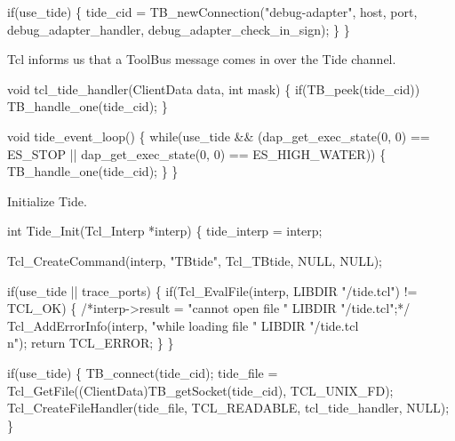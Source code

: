   if(use_tide) \{
    tide_cid = TB_newConnection("debug-adapter", host, port, 
                        debug_adapter_handler, debug_adapter_check_in_sign);
  \}
\}
\nwendcode{}\nwdocspar


Tcl informs us that a ToolBus message comes in over the Tide channel.

\nwenddocs{}\endmoddef\let\nwnotused=\nwoutput{}
void tcl_tide_handler(ClientData data, int mask)
\{
  if(TB_peek(tide_cid))
    TB_handle_one(tide_cid);
\}
\nwendcode{}\nwdocspar


\nwenddocs{}\endmoddef\let\nwnotused=\nwoutput{}
void tide_event_loop()
\{
  while(use_tide && (dap_get_exec_state(0, 0) == ES_STOP || 
        dap_get_exec_state(0, 0) == ES_HIGH_WATER)) \{
    TB_handle_one(tide_cid);
  \}
\}
\nwendcode{}\nwdocspar


Initialize Tide.

\nwenddocs{}\endmoddef\let\nwnotused=\nwoutput{}
int Tide_Init(Tcl_Interp *interp)
\{
  tide_interp = interp;

  Tcl_CreateCommand(interp, "TBtide", Tcl_TBtide, NULL, NULL);

  if(use_tide || trace_ports) \{
    if(Tcl_EvalFile(interp, LIBDIR "/tide.tcl") != TCL_OK) \{
      /*interp->result = "cannot open file " LIBDIR "/tide.tcl";*/
      Tcl_AddErrorInfo(interp, "while loading file " LIBDIR "/tide.tcl\\n");
      return TCL_ERROR;
    \}
  \}

  if(use_tide) \{
    TB_connect(tide_cid);
    tide_file = Tcl_GetFile((ClientData)TB_getSocket(tide_cid), TCL_UNIX_FD);
    Tcl_CreateFileHandler(tide_file, TCL_READABLE, tcl_tide_handler, NULL);
  \}

